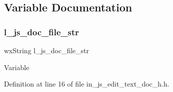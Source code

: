 \subsection{Variable Documentation}
\mbox{\label{in__js__edit__text__doc__h_8h_aea2050733a48c99f24c96ecf970a9952}} 
\subsubsection{l\_js\_doc\_file\_str}
{\footnotesize\ttfamily wx\+String l\+\_\+js\+\_\+doc\+\_\+file\+\_\+str}

Variable 

Definition at line 16 of file in\+\_\+js\+\_\+edit\+\_\+text\+\_\+doc\+\_\+h.\+h.


